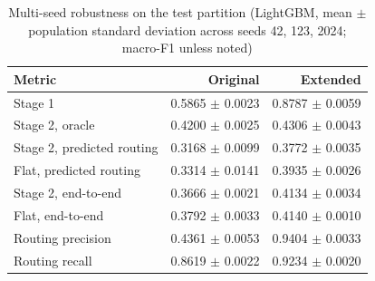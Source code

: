 \begin{table}[!t]
\caption{Multi-seed robustness on the test partition (LightGBM, mean $\pm$
population standard deviation across seeds 42, 123, 2024; macro-F1
unless noted)}
\label{tab:multiseed}
\centering
\small
\begin{tabular}{lrr}
\toprule
Metric & Original & Extended \\
\midrule
Stage 1 & 0.5865 $\pm$ 0.0023 & 0.8787 $\pm$ 0.0059 \\
Stage 2, oracle & 0.4200 $\pm$ 0.0025 & 0.4306 $\pm$ 0.0043 \\
Stage 2, predicted routing & 0.3168 $\pm$ 0.0099 & 0.3772 $\pm$ 0.0035 \\
Flat, predicted routing & 0.3314 $\pm$ 0.0141 & 0.3935 $\pm$ 0.0026 \\
Stage 2, end-to-end & 0.3666 $\pm$ 0.0021 & 0.4134 $\pm$ 0.0034 \\
Flat, end-to-end & 0.3792 $\pm$ 0.0033 & 0.4140 $\pm$ 0.0010 \\
Routing precision & 0.4361 $\pm$ 0.0053 & 0.9404 $\pm$ 0.0033 \\
Routing recall & 0.8619 $\pm$ 0.0022 & 0.9234 $\pm$ 0.0020 \\
\bottomrule
\end{tabular}
\end{table}
